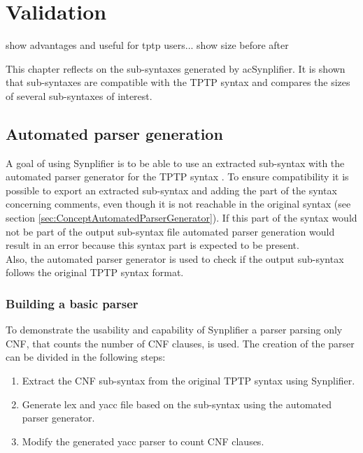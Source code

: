 \chapter{Validation}\label{sec:Validation}

show advantages and useful for tptp users...
show size before after 

This chapter reflects on the sub-syntaxes generated by ac{Synplifier}. It is shown that sub-syntaxes are compatible with the \ac{TPTP} syntax and compares the sizes of several sub-syntaxes of interest.

%

\section{Automated parser generation}\label{sec:ValidationAutomatedParserGeneration}

A goal of using \ac{Synplifier} is to be able to use an extracted sub-syntax with the automated parser generator for the \ac{TPTP} syntax \cite{VS06}.
To ensure compatibility it is possible to export an extracted sub-syntax and adding the part of the syntax concerning comments, even though it is not reachable in the original syntax (see section \ref{sec:ConceptAutomatedParserGenerator}). If this part of the syntax would not be part of the output sub-syntax file automated parser generation would result in an error because this syntax part is expected to be present.\\
Also, the automated parser generator is used to check if the output sub-syntax follows the original \ac{TPTP} syntax format.

\subsection{Building a basic parser}\label{sec:ValidationAutomatedParserGenerationBuildingBasicParser}

To demonstrate the usability and capability of \ac{Synplifier} a parser parsing only \ac{CNF}, that counts the number of \ac{CNF} clauses, is used.
The creation of the parser can be divided in the following steps:
\begin{enumerate}%
	\item Extract the \ac{CNF} sub-syntax from the original \ac{TPTP} syntax using \ac{Synplifier}.
	\item Generate lex and yacc file based on the sub-syntax using the automated parser generator.
	\item Modify the generated yacc parser to count \ac{CNF} clauses.
\end{enumerate}

